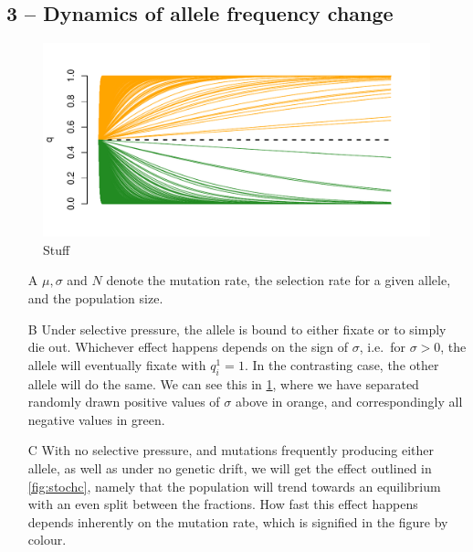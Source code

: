 \documentclass[10pt]{article}\usepackage[]{graphicx}\usepackage[]{color}
\makeatletter
\def\maxwidth{ %
  \ifdim\Gin@nat@width>\linewidth
    \linewidth
  \else
    \Gin@nat@width
  \fi
}
\theoremstyle{plain}
\makeatother
\begin{document}
\begin{multicols*}{2}
\begin{enumerate}
\end{enumerate}
\subsection*{3 -- Dynamics of allele frequency change}


\begin{Schunk}
\begin{figure}[H]

{\centering \includegraphics[width=\maxwidth]{figure/twocolumn-comp-1} 

}

\caption[Stuff]{Stuff}\label{fig:comp}
\end{figure}
\end{Schunk}
\begin{enumerate}
  \item[A] $\mu, \sigma$ and $N$ denote the mutation rate, the selection
    rate for a given allele, and the population size.
  \item[B] Under selective pressure, the allele is bound to either fixate or to
    simply die out. Whichever effect happens depends on the sign of $\sigma$,
    i.e.\ for $\sigma > 0$, the allele will eventually fixate with $q^1_i = 1$.
    In the contrasting case, the other allele will do the same. We can see this
    in \cref{fig:comp}, where we have separated randomly drawn positive values of $\sigma$ above     in orange, and correspondingly all negative values in green.
  \item[C] With no selective pressure, and mutations frequently producing either allele, as well as under no genetic drift, we will get the effect outlined in \cref{fig:stochc}, namely that the population will trend towards an equilibrium with an even split between the fractions. How fast this effect happens depends inherently on the mutation rate, which is signified in the figure by colour.  
\end{enumerate}
\begin{Schunk}
\begin{figure}[H]


\end{figure}
\end{Schunk}
\end{multicols*}
\end{document}
